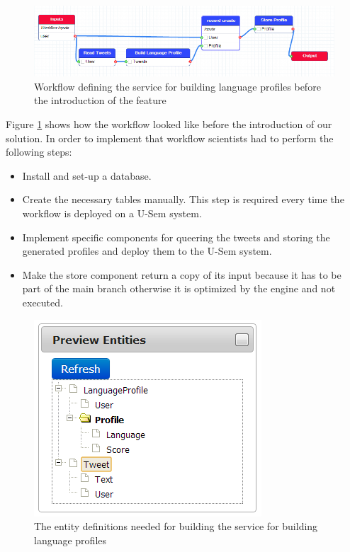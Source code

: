 \begin{figure}[h!]
  \centering
  	\includegraphics[scale=0.5]{storage/eval/before.png}
  \caption{Workflow defining the service for building language profiles before the introduction of the feature}
  \label{fig:storageEvalBefore}
\end{figure}

Figure \ref{fig:storageEvalBefore} shows how the workflow looked like before the introduction of our solution. In order to implement that workflow scientists had to perform the following steps:
\begin{itemize}
	\item Install and set-up a database.
	\item Create the necessary tables manually. This step is required every time the workflow is deployed on a U-Sem system. 
	\item Implement specific components for queering the tweets and storing the generated profiles and deploy them to the U-Sem system.
	\item Make the store component return a copy of its input because it has to be part of the main branch otherwise it is optimized by the engine and not executed.
\end{itemize}

\begin{figure}[h!]
  \centering
  	\includegraphics[scale=0.5]{storage/eval/entities.png}
  \caption{The entity definitions needed for building the service for building language profiles}
  \label{fig:storageEvalEntities}
\end{figure}


